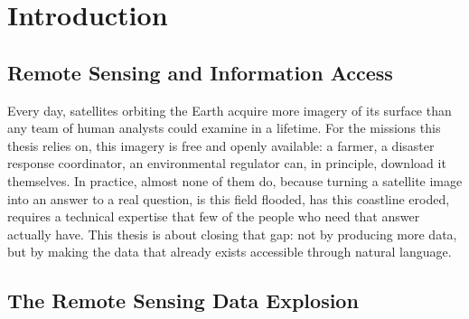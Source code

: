 
\chapter{Introduction}
\label{chap:intro}

\startcontents[chapters]

\section{Remote Sensing and Information Access}
\label{sec:intro_rs_access}
 
Every day, satellites orbiting the Earth acquire more imagery of its surface than any team of human analysts could examine in a lifetime. For the missions this thesis relies on, this imagery is free and openly available: a farmer, a disaster response coordinator, an environmental regulator can, in principle, download it themselves. In practice, almost none of them do, because turning a satellite image into an answer to a real question, is this field flooded, has this coastline eroded, requires a technical expertise that few of the people who need that answer actually have. This thesis is about closing that gap: not by producing more data, but by making the data that already exists accessible through natural language.
 
\section{The Remote Sensing Data Explosion}
\label{sec:intro_explosion}
 
